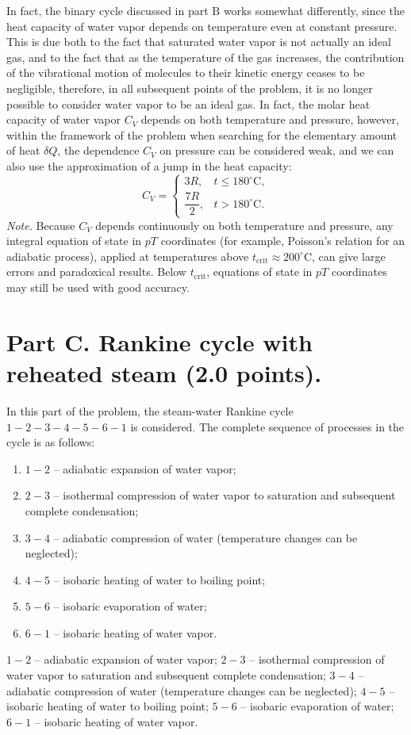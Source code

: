 \documentclass[11pt,a4paper]{article}
\begin{document}
In fact, the binary cycle discussed in part $\mathrm{B}$ works somewhat differently, since the heat capacity of water vapor depends on temperature even at constant pressure. This is due both to the fact that saturated water vapor is not actually an ideal gas, and to the fact that as the temperature of the gas increases, the contribution of the vibrational motion of molecules to their kinetic energy ceases to be negligible, therefore, in all subsequent points of the problem, it is no longer possible to consider water vapor to be an ideal gas. In fact, the molar heat capacity of water vapor $C_V$ depends on both temperature and pressure, however, within the framework of the problem when searching for the elementary amount of heat $\delta{Q}$, the dependence $C_V$ on pressure can be considered weak, and we can also use the approximation of a jump in the heat capacity:
$$C_V=\begin{cases}
3R, & t \leq 180^\circ\mathrm{C}, \\[6pt]
\dfrac{7R}{2}, & t > 180^\circ\mathrm{C}.
\end{cases}$$
\textit{Note.} Because $C_V$ depends continuously on both temperature and pressure, any integral equation of state in $pT$ coordinates (for example, Poisson’s relation for an adiabatic process), applied at temperatures above $t_{\mathrm{crit}}\approx 200^\circ\mathrm{C}$, can give large errors and paradoxical results. Below $t_{\mathrm{crit}}$, equations of state in $pT$ coordinates may still be used with good accuracy.

\section*{Part C. Rankine cycle with reheated steam (2.0 points).}

In this part of the problem, the steam-water Rankine cycle $1-2-3-4-5-6-1$ is considered. The complete sequence of processes in the cycle is as follows:
\begin{enumerate}
    \item $1-2$ -- adiabatic expansion of water vapor;
    \item $2-3$ -- isothermal compression of water vapor to saturation and subsequent complete condensation;
    \item $3-4$ -- adiabatic compression of water (temperature changes can be neglected);
    \item $4-5$ -- isobaric heating of water to boiling point;
    \item $5-6$ -- isobaric evaporation of water;
    \item $6-1$ -- isobaric heating of water vapor.
\end{enumerate} $1-2$ – adiabatic expansion of water vapor; $2-3$ – isothermal compression of water vapor to saturation and subsequent complete condensation; $3-4$ – adiabatic compression of water (temperature changes can be neglected); $4-5$ – isobaric heating of water to boiling point; $5-6$ – isobaric evaporation of water; $6-1$ – isobaric heating of water vapor.
\end{document}
